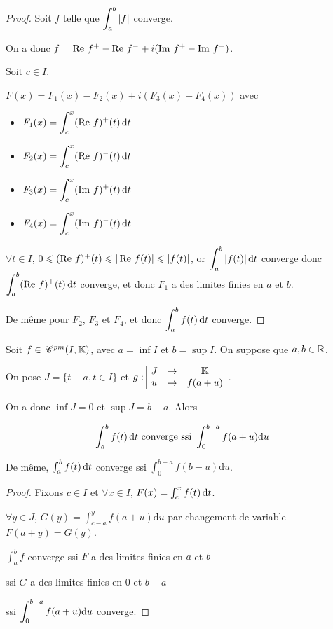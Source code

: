 \begin{proof}
    Soit $f$ telle que $\displaystyle \int_{a}^b |f|$ converge. 
    
    On a donc 
    $f = \operatorname{Re} \, f^+ - \operatorname{Re} \, f^- + i (\operatorname{Im} \, f^+ - \operatorname{Im} \, f^-)$.

    Soit $c \in I$. 

    $F(x) = F_1(x) - F_2(x) + i (F_3(x) - F_4(x))$ avec
    \begin{itemize}
        \item $F_1(x) = \displaystyle \int_c^x (\operatorname{Re} \, f)^+(t) \,\mathrm{d}t$
        \item $F_2(x) = \displaystyle \int_c^x (\operatorname{Re} \, f)^-(t) \,\mathrm{d}t$
        \item $F_3(x) = \displaystyle \int_c^x (\operatorname{Im} \, f)^+(t) \,\mathrm{d}t$
        \item $F_4(x) = \displaystyle \int_c^x (\operatorname{Im} \, f)^-(t) \,\mathrm{d}t$
    \end{itemize}

    $\forall t \in I$, $0 \leqslant (\operatorname{Re} \, f)^+(t) \leqslant |\operatorname{Re} \, f(t)| \leqslant |f(t)|$, or 
    $\displaystyle \int_{a }^{b } |f(t)| \,\mathrm{d}t$ converge donc \\ 
    $\displaystyle \int_{a }^{b } (\operatorname{Re} \, f)^+(t) \,\mathrm{d}t$ converge, 
    et donc $F_1$ a des limites finies en $a$ et $b$.

    De même pour $F_2$, $F_3$ et $F_4$, et donc $\displaystyle \int_{a }^{b } f(t) \,\mathrm{d}t$ converge. 
\end{proof}


\begin{proposition}{}{}
    Soit $f \in \,\mathscr C^{pm} (I, \mathbb{K})$, avec $a = \inf I$ et $b = \sup I$. On suppose que $a, b \in \mathbb{R}$. 

    On pose $J = \{t - a, t \in I\}$ et $g: \space \begin{array}{|ccc} \displaystyle J & \to & \displaystyle \mathbb{K} \\ \displaystyle u & \mapsto & \displaystyle f(a + u) \end{array}$. 

    On a donc $\inf J = 0$ et $\sup J = b - a$. Alors 
    
    $$ \int_{a }^{b } f(t) \,\mathrm{d}t \text{ converge ssi } \int_{0 }^{b - a }f(a + u) \mathrm d u$$

    De même, $\int_a^b f(t) \,\mathrm{d}t$ converge ssi $\int_0^{b - a} f(b - u) \mathrm d u$. 
\end{proposition}


\begin{proof}
    Fixons $c \in I$ et $\forall x \in I$, $F(x) = \int_c^x f(t) \,\mathrm{d}t$.

    $\forall y \in J$, $G(y) = \int_{c - a}^{y} f(a + u) \mathrm d u$ par changement de variable 
    $F(a + y) = G(y)$.

    $\int_a^b f$ converge ssi $F$ a des limites finies en $a$ et $b$ 

    ssi $G$ a des limites finies en $0$ et $b - a$

    ssi $\displaystyle \int_{0}^{b - a} f(a + u) \mathrm d u$ converge.
\end{proof}


